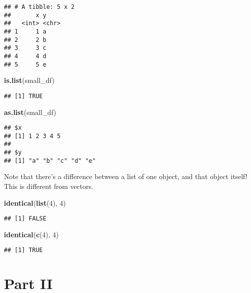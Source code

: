 \documentclass[]{article}
\newenvironment{Shaded}{\begin{snugshade}}{\end{snugshade}}
\newcommand{\KeywordTok}[1]{\textcolor[rgb]{0.13,0.29,0.53}{\textbf{#1}}}
\newcommand{\DecValTok}[1]{\textcolor[rgb]{0.00,0.00,0.81}{#1}}
\newcommand{\NormalTok}[1]{#1}
\begin{document}
\begin{verbatim}
## # A tibble: 5 x 2
##       x y    
##   <int> <chr>
## 1     1 a    
## 2     2 b    
## 3     3 c    
## 4     4 d    
## 5     5 e
\end{verbatim}

\begin{Shaded}
\begin{Highlighting}[]
\KeywordTok{is.list}\NormalTok{(small_df)}
\end{Highlighting}
\end{Shaded}

\begin{verbatim}
## [1] TRUE
\end{verbatim}

\begin{Shaded}
\begin{Highlighting}[]
\KeywordTok{as.list}\NormalTok{(small_df)}
\end{Highlighting}
\end{Shaded}

\begin{verbatim}
## $x
## [1] 1 2 3 4 5
## 
## $y
## [1] "a" "b" "c" "d" "e"
\end{verbatim}

Note that there's a difference between a list of one object, and that
object itself! This is different from vectors.

\begin{Shaded}
\begin{Highlighting}[]
\KeywordTok{identical}\NormalTok{(}\KeywordTok{list}\NormalTok{(}\DecValTok{4}\NormalTok{), }\DecValTok{4}\NormalTok{)}
\end{Highlighting}
\end{Shaded}

\begin{verbatim}
## [1] FALSE
\end{verbatim}

\begin{Shaded}
\begin{Highlighting}[]
\KeywordTok{identical}\NormalTok{(}\KeywordTok{c}\NormalTok{(}\DecValTok{4}\NormalTok{), }\DecValTok{4}\NormalTok{)}
\end{Highlighting}
\end{Shaded}

\begin{verbatim}
## [1] TRUE
\end{verbatim}

\section{Part II}\label{part-ii}
\end{document}
